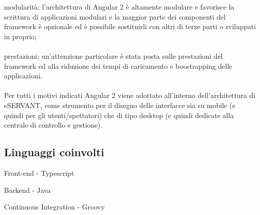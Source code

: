 modularità: l’architettura di Angular 2 è altamente modulare e favorisce la
scrittura di applicazioni modulari e la maggior parte dei componenti del
framework è opzionale ed è possibile sostituirli con altri di terze parti o
sviluppati in proprio;
\paragraph{}

prestazioni; un’attenzione particolare è stata posta sulle prestazioni del
framework ed alla riduzione dei tempi di caricamento e boostrapping delle
applicazioni.
\paragraph{}

Per tutti i motivi indicati Angular 2 viene adottato all’interno dell’architettura di
eSERVANT, come strumento per il disegno delle interfacce sia su mobile (e quindi per
gli utenti/spettatori) che di tipo desktop (e quindi dedicate alla centrale di controllo e
gestione).
\paragraph{}



\subsection{Linguaggi coinvolti}
Front-end
- Typescript

Backend
- Java

Continuous Integration
- Groovy
